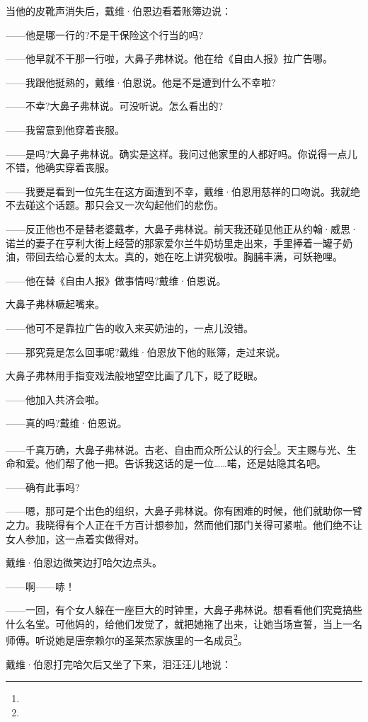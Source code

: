 \par 当他的皮靴声消失后，戴维·伯恩边看着账簿边说：
\par ——他是哪一行的?不是干保险这个行当的吗?
\par ——他早就不干那一行啦，大鼻子弗林说。他在给《自由人报》拉广告哪。
\par ——我跟他挺熟的，戴维·伯恩说。他是不是遭到什么不幸啦?
\par ——不幸?大鼻子弗林说。可没听说。怎么看出的?
\par ——我留意到他穿着丧服。
\par ——是吗?大鼻子弗林说。确实是这样。我问过他家里的人都好吗。你说得一点儿不错，他确实穿着丧服。
\par ——我要是看到一位先生在这方面遭到不幸，戴维·伯恩用慈祥的口吻说。我就绝不去碰这个话题。那只会又一次勾起他们的悲伤。
\par ——反正他也不是替老婆戴孝，大鼻子弗林说。前天我还碰见他正从约翰·威思·诺兰的妻子在亨利大街上经营的那家爱尔兰牛奶坊里走出来，手里捧着一罐子奶油，带回去给心爱的太太。真的，她在吃上讲究极啦。胸脯丰满，可妖艳哩。
\par ——他在替《自由人报》做事情吗?戴维·伯恩说。
\par 大鼻子弗林噘起嘴来。
\par ——他可不是靠拉广告的收入来买奶油的，一点儿没错。
\par ——那究竟是怎么回事呢?戴维·伯恩放下他的账簿，走过来说。
\par 大鼻子弗林用手指变戏法般地望空比画了几下，眨了眨眼。
\par ——他加入共济会啦。
\par ——真的吗?戴维·伯恩说。
\par ——千真万确，大鼻子弗林说。古老、自由而众所公认的行会\footnote{}。天主赐与光、生命和爱。他们帮了他一把。告诉我这话的是一位……喏，还是姑隐其名吧。
\par ——确有此事吗?
\par ——嗯，那可是个出色的组织，大鼻子弗林说。你有困难的时候，他们就助你一臂之力。我晓得有个人正在千方百计想参加，然而他们那门关得可紧啦。他们绝不让女人参加，这一点着实做得对。
\par 戴维·伯恩边微笑边打哈欠边点头。
\par ——啊——哧！
\par ——一回，有个女人躲在一座巨大的时钟里，大鼻子弗林说。想看看他们究竟搞些什么名堂。可他妈的，给他们发觉了，就把她拖了出来，让她当场宣誓，当上一名师傅。听说她是唐奈赖尔的圣莱杰家族里的一名成员\footnote{}。
\par 戴维·伯恩打完哈欠后又坐了下来，泪汪汪儿地说：
